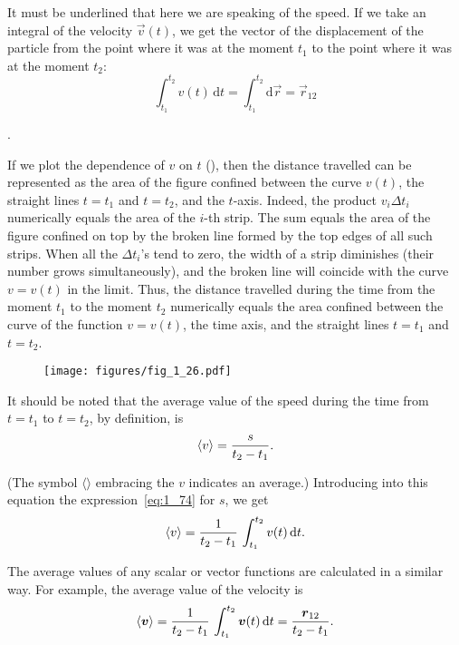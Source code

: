 \noindent
It must be underlined that here we are speaking of the speed. If we take an integral of the velocity $\vec{v}(t)$, we get the vector of the displacement of the particle from the point where it was at the moment $t_1$ to the point where it was at the moment $t_2$:
\begin{equation}\label{eq:1_75}
\int_{t_1}^{t_2} v(t)\,\mathrm{d}t = \int_{t_1}^{t_2} \mathrm{d}\vec{r} = \vec{r}_{12}
\end{equation}

.

If we plot the dependence of $v$ on $t$ (), then the distance travelled can be represented as the area of the figure confined between the curve $v(t)$, the straight lines $t = t_1$ and $t = t_2$, and the $t$-axis. Indeed, the product $v_i\Delta t_i$ numerically equals the area of the $i$-th strip. The sum  equals the area of the figure confined on top by the broken line formed by the top edges of all such strips. When all the $\Delta t_i$'s tend to zero, the width of a strip diminishes (their number grows simultaneously), and the broken line will coincide with the curve $v = v(t)$ in the limit. Thus, the distance travelled during the time from the moment $t_1$ to the moment $t_2$ numerically equals the area confined between the curve of the function $v = v(t)$, the time axis, and the straight lines $t = t_1$ and $t = t_2$. 

\begin{figure}[t]
	\begin{center}
		\texttt{[image: figures/fig\_1\_26.pdf]}
		\caption[]{}
		\label{fig:1_26}
	\end{center}
	\vspace{-0.8cm}
\end{figure}

It should be noted that the average value of the speed during
the time from $t = t_1$ to $t = t_2$, by definition, is
\begin{equation*}
\left\langle v \right\rangle = \frac{s}{t_2-t_1}.
\end{equation*}

\noindent
(The symbol $\langle\rangle$ embracing the $v$ indicates an average.) Introducing into this equation the expression~\eqref{eq:1_74} for $s$, we get
\begin{equation}\label{eq:1_76}
\left\langle v \right\rangle = \frac{1}{t_2-t_1}\,\int_{t_1}^{t_2}v(t)\,\mathrm{d}t.
\end{equation}

\noindent
The average values of any scalar or vector functions are calculated in a similar way. For example, the average value of the velocity is
\begin{equation}\label{eq:1_77}
\left\langle \boldsymbol{v} \right\rangle = \frac{1}{t_2-t_1}\,\int_{t_1}^{t_2}\boldsymbol{v}(t)\,\mathrm{d}t = \frac{\boldsymbol{r}_{12}}{t_2-t_1}.
\end{equation}

